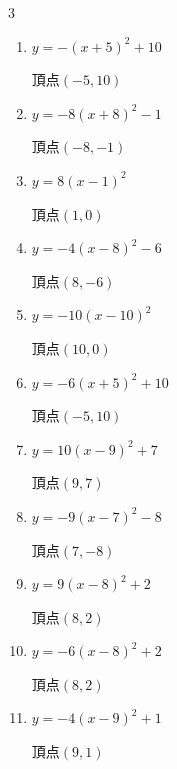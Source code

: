 \begin{multicols}{3}
\begin{enumerate}
        $\displaystyle 頂点\left( -2 , -9 \right)$

  \item $\displaystyle y=-\left( x+5\right)^{2}+10$

        $\displaystyle 頂点\left( -5 , 10 \right)$

  \item $\displaystyle y=-8\left( x+8\right)^{2}-1$

        $\displaystyle 頂点\left( -8 , -1 \right)$

  \item $\displaystyle y=8\left( x-1\right)^{2}$

        $\displaystyle 頂点\left( 1 , 0 \right)$

  \item $\displaystyle y=-4\left( x-8\right)^{2}-6$

        $\displaystyle 頂点\left( 8 , -6 \right)$

  \item $\displaystyle y=-10\left( x-10\right)^{2}$

        $\displaystyle 頂点\left( 10 , 0 \right)$

  \item $\displaystyle y=-6\left( x+5\right)^{2}+10$

        $\displaystyle 頂点\left( -5 , 10 \right)$

  \item $\displaystyle y=10\left( x-9\right)^{2}+7$

        $\displaystyle 頂点\left( 9 , 7 \right)$

\columnbreak %

  \item $\displaystyle y=-9\left( x-7\right)^{2}-8$

        $\displaystyle 頂点\left( 7 , -8 \right)$

  \item $\displaystyle y=9\left( x-8\right)^{2}+2$

        $\displaystyle 頂点\left( 8 , 2 \right)$

  \item $\displaystyle y=-6\left( x-8\right)^{2}+2$

        $\displaystyle 頂点\left( 8 , 2 \right)$

  \item $\displaystyle y=-4\left( x-9\right)^{2}+1$

        $\displaystyle 頂点\left( 9 , 1 \right)$


\end{enumerate}
\end{multicols}
